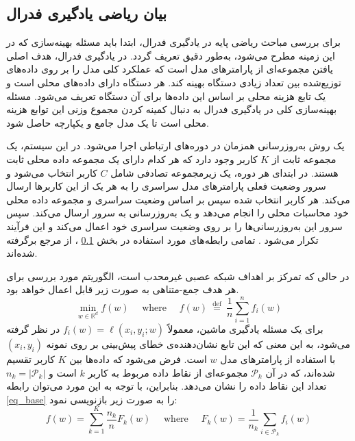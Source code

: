 \subsection{
	بیان ریاضی یادگیری فدرال
}\label{sec_FL_math}
برای بررسی مباحث ریاضی پایه در یادگیری فدرال، ابتدا باید مسئله بهینه‌سازی که در این زمینه مطرح می‌شود، به‌طور دقیق تعریف گردد. در یادگیری فدرال، هدف اصلی یافتن مجموعه‌ای از پارامترهای مدل است که عملکرد کلی مدل را بر روی داده‌های توزیع‌شده بین تعداد زیادی دستگاه بهینه کند. هر دستگاه دارای داده‌های محلی است و یک تابع هزینه محلی بر اساس این داده‌ها برای آن دستگاه تعریف می‌شود. مسئله بهینه‌سازی کلی در یادگیری فدرال به دنبال کمینه کردن مجموع وزنی این توابع هزینه محلی است تا یک مدل جامع و یکپارچه حاصل شود.

یک روش به‌روزرسانی همزمان در دوره‌های ارتباطی اجرا می‌شود. در این سیستم، یک مجموعه ثابت از
$K$
کاربر وجود دارد که هر کدام دارای یک مجموعه داده محلی ثابت هستند. در ابتدای هر دوره، یک زیرمجموعه تصادفی شامل
$C$
کاربر‌ انتخاب می‌شود و سرور وضعیت فعلی پارامترهای مدل سراسری را به هر یک از این کاربر‌ها ارسال می‌کند. هر کاربر انتخاب ‌شده سپس بر اساس وضعیت سراسری و مجموعه داده محلی خود محاسبات محلی را انجام می‌دهد و یک به‌روزرسانی به سرور ارسال می‌کند. سپس سرور این به‌روزرسانی‌ها را بر روی وضعیت سراسری خود اعمال می‌کند و این فرآیند تکرار می‌شود
\cite{mcmahan2017communication}.
تمامی رابطه‌های مورد استفاده در بخش
\ref{sec_FL_math}%
، از مرجع 
\cite{mcmahan2017communication} 
برگرفته شده‌اند.

در حالی که تمرکز بر اهداف شبکه عصبی غیرمحدب%
است، الگوریتم مورد بررسی برای هر هدف جمع-متناهی%
به صورت زیر قابل اعمال خواهد بود.
\begin{equation}
	\min _{w \in \mathbb{R}^d} f(w) \quad \text { where } \quad f(w) \stackrel{\text { def }}{=} \frac{1}{n} \sum_{i=1}^n f_i(w)
	\label{eq_base}
\end{equation}
برای یک مسئله یادگیری ماشین، معمولاً
$f_i(w)=\ell\left(x_i, y_i ; w\right)$
در نظر گرفته می‌شود، به این معنی که این تابع نشان‌دهنده‌ی خطای پیش‌بینی بر روی نمونه
$(x_i, y_i)$
با استفاده از پارامترهای مدل
$w$
است. فرض می‌شود که داده‌ها بین
$K$
کاربر تقسیم شده‌اند، که در آن
$\mathcal{P}_k$
مجموعه‌ای از نقاط داده مربوط به کاربر
$k$
است و
$n_k=\left|\mathcal{P}_k\right|$
تعداد این نقاط داده را نشان می‌دهد. بنابراین، با توجه به این مورد می‌توان رابطه
\eqref{eq_base}
را به صورت زیر بازنویسی نمود:
\begin{equation}
	f(w)=\sum_{k=1}^K \frac{n_k}{n} F_k(w) \quad \text { where } \quad F_k(w)=\frac{1}{n_k} \sum_{i \in \mathcal{P}_k} f_i(w)
\end{equation}

